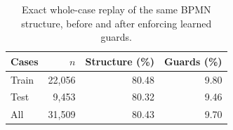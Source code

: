 \begin{table}[t]
\centering
\caption{Exact whole-case replay of the same BPMN structure, before and after enforcing learned guards.}
\label{tab:guarded-coverage}
\begin{tabular}{lrrr}
\hline
Cases & $n$ & Structure (\%) & Guards (\%) \\
\hline
Train & 22,056 & 80.48 & 9.80 \\
Test & 9,453 & 80.32 & 9.46 \\
All & 31,509 & 80.43 & 9.70 \\
\hline
\end{tabular}
\end{table}
